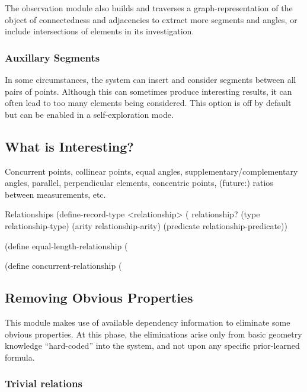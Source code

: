 The observation module also builds and traverses a
graph-representation of the object of connectedness and adjacencies to
extract more segments and angles, or include intersections of elements
in its investigation.

\subsubsection{Auxillary Segments}

In some circumstances, the system can insert and consider segments
between all pairs of points. Although this can sometimes produce
interesting results, it can often lead to too many elements being
considered. This option is off by default but can be enabled in a
self-exploration mode.

\subsection{What is Interesting?}

Concurrent points, collinear points, equal angles,
supplementary/complementary angles, parallel, perpendicular elements,
concentric points, (future:) ratios between measurements, etc.

\begin{code-listing}{Relationships}
(define-record-type <relationship>
  (%
  relationship?
  (type relationship-type)
  (arity relationship-arity)
  (predicate relationship-predicate))

(define equal-length-relationship
  (%

(define concurrent-relationship
  (%
\end{code-listing}

\subsection{Removing Obvious Properties}

This module makes use of available dependency information to eliminate
some obvious properties. At this phase, the eliminations arise only
from basic geometry knowledge ``hard-coded'' into the system, and not
upon any specific prior-learned formula.

\subsubsection{Trivial relations}

